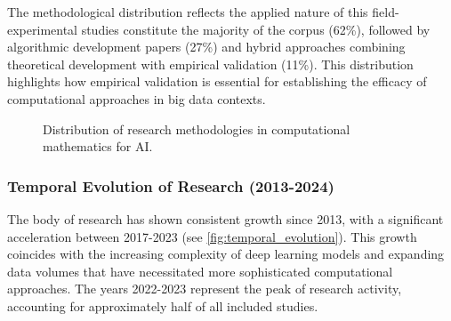 \documentclass[acmsmall]{acmart}
\begin{document}
The methodological distribution reflects the applied nature of this field-experimental studies constitute the majority of the corpus (62\%), followed by algorithmic development papers (27\%) and hybrid approaches combining theoretical development with empirical validation (11\%). This distribution highlights how empirical validation is essential for establishing the efficacy of computational approaches in big data contexts.

\begin{figure}[ht]
    \centering
    \caption{Distribution of research methodologies in computational mathematics for AI.}
    \label{fig:methodology_distribution}
\end{figure}

\subsubsection{Temporal Evolution of Research (2013-2024)}\label{subsubsec:overview-of-included-studies:temporal-evolution-of-research-2016-2024}
The body of research has shown consistent growth since 2013, with a significant acceleration between 2017-2023 (see \cref{fig:temporal_evolution}). This growth coincides with the increasing complexity of deep learning models and expanding data volumes that have necessitated more sophisticated computational approaches. The years 2022-2023 represent the peak of research activity, accounting for approximately half of all included studies.
\end{document}
